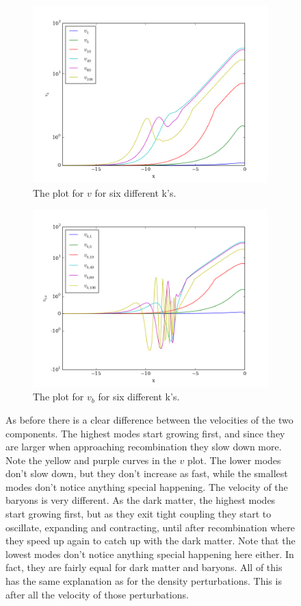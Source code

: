 \documentclass[a4paper]{report}
\begin{document}
\begin{figure}[ht]
\begin{subfigure}{.5\textwidth}
  \includegraphics[width=\textwidth]{v.png}
 \caption{The plot for $v$ for six different k's.}
 \label{fig:v}
\end{subfigure}
\begin{subfigure}{.5\textwidth}
\includegraphics[width=\textwidth]{vb.png}
 \caption{The plot for $v_b$ for six different k's.}
 \label{fig:vb}
\end{subfigure}
\caption{As before there is a clear difference between the velocities of the two components. The highest modes start growing first, and since they are larger when approaching recombination they slow down more. Note the yellow and purple curves in the $v$ plot. The lower modes don't slow down, but they don't increase as fast, while the smallest modes don't notice anything special happening. The velocity of the baryons is very different. As the dark matter, the highest modes start growing first, but as they exit tight coupling they start to oscillate, expanding and contracting, until after recombination where they speed up again to catch up with the dark matter. Note that the lowest modes don't notice anything special happening here either. In fact, they are fairly equal for dark matter and baryons. All of this has the same explanation as for the density perturbations. This is after all the velocity of those perturbations.}

\end{figure}
\end{document}

